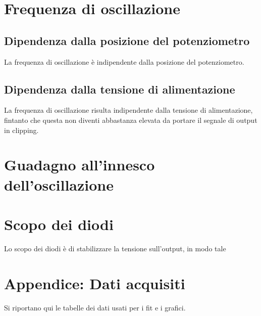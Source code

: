 \documentclass[10pt,a4paper]{article}
\begin{document}
\section{Frequenza di oscillazione}

\subsection{Dipendenza dalla posizione del potenziometro}
La frequenza di oscillazione è indipendente dalla posizione del potenziometro.

\subsection{Dipendenza dalla tensione di alimentazione}
La frequenza di oscillazione risulta indipendente dalla tensione di alimentazione, fintanto che questa non diventi abbastanza elevata da portare il segnale di output in clipping.

\section{Guadagno all'innesco dell'oscillazione}

\section{Scopo dei diodi}
Lo scopo dei diodi è di stabilizzare la tensione sull'output, in modo tale 

\pagebreak
\section{Appendice: Dati acquisiti}
Si riportano qui le tabelle dei dati usati per i fit e i grafici.
\centering
\begin{figure}[H]
	\centering
	\resizebox{0.7\textwidth}{!}{
	}
	\label{tab:loop}
\end{figure}
\end{document}

